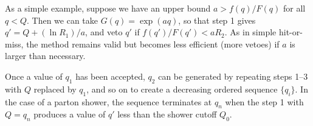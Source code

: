 As a simple example, suppose we have an upper bound $a >f(q)/F(q)$
for all $q<Q$.  Then we can take $G(q)=\exp(aq)$, so that step 1 gives
$q'=Q+(\ln R_1)/a$, and veto $q'$ if $f(q')/F(q')<a R_2$. As in simple
hit-or-miss, the method remains valid but becomes less efficient (more
vetoes) if $a$ is larger than necessary.

Once a value of $q_1$ has been accepted, $q_2$ can be generated by
repeating steps 1--3 with $Q$ replaced by $q_1$, and so on to
create a decreasing ordered sequence $\{q_i\}$.  In the case of a
parton shower, the sequence terminates at $q_n$ when the step 1 with
$Q=q_n$ produces a value of $q'$ less than the shower cutoff $Q_0$.













